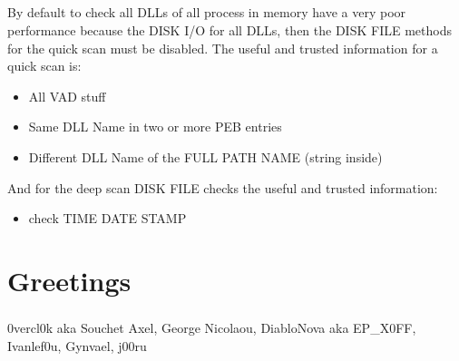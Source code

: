 \documentclass[12pt,a4paper,english]{book}
\newcommand{\paraph}{\paragraph{}}
\begin{document}
\paraph{}
By default to check all DLLs of all process in memory have a very poor performance because the DISK I/O for all DLLs, then the DISK FILE methods for the quick scan must be disabled. The useful and trusted information for a quick scan is: 

{\bf
\begin{itemize}
\item { All VAD stuff }
\item { Same DLL Name in two or more PEB entries }
\item { Different DLL Name of the FULL PATH NAME (string inside) }
\end{itemize}
}
And for the deep scan DISK FILE checks the useful and trusted information:

{\bf
\begin{itemize}
\item { check TIME DATE STAMP }
\end{itemize}
}

\paraph{}

\chapter{Greetings}
\paraph{}
0vercl0k aka Souchet Axel, George Nicolaou, DiabloNova aka EP\_X0FF, Ivanlef0u, Gynvael, j00ru

\fancyhead[LE,RO]{}
\printbibliography[heading=bibintoc]

\clearpage
{}
\printindex
\end{document}
